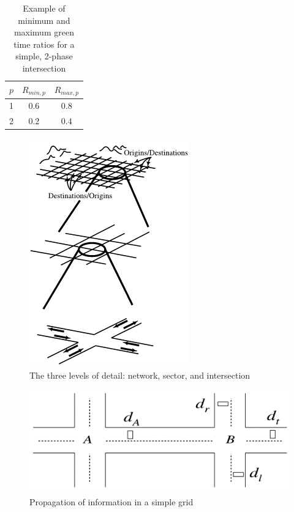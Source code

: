\documentclass [a4paper, 10pt]{article}
\begin{document}
\begin{table}[!ht]
\begin{center}
\begin{tabular}{c|c|c}
$p$ & $R_{min,p}$ & $R_{max,p}$ \\ \hline
1 & $0.6$ & $0.8$ \\ 
2 & $0.2$ & $0.4$
\end{tabular}
\end{center}
\caption{Example of minimum and maximum green time ratios for a simple, 2-phase intersection}
\label{tbl:minmaxratios}
\end{table}

\begin{figure}[!ht]
\begin{center}
\includegraphics[scale=0.5]{rhodes_hierachy.png} 
\end{center}
\caption{The three levels of detail: network, sector, and intersection}
\label{fig:rhodes_hierarchi}
\end{figure}

\begin{figure}[!ht]
\begin{center}
\includegraphics[scale=0.5]{rhodes_prediction-strategy.png} 
\end{center}
\caption{Propagation of information in a simple grid}
\label{fig:rhodes_predict}
\end{figure}
\end{document}
